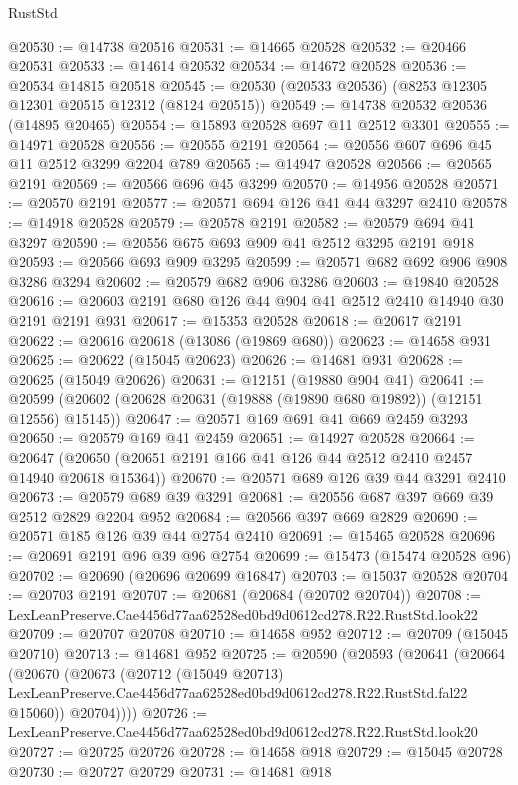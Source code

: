\begin{lexlean}{RustStd}
\begin{coremodule}
@20530 := @14738 @20516
@20531 := @14665 @20528
@20532 := @20466 @20531
@20533 := @14614 @20532
@20534 := @14672 @20528
@20536 := @20534 @14815 @20518
@20545 := @20530 (@20533 @20536) (@8253 @12305 @12301 @20515 @12312 (@8124 @20515))
@20549 := @14738 @20532 @20536 (@14895 @20465)
@20554 := @15893 @20528 @697 @11 @2512 @3301
@20555 := @14971 @20528
@20556 := @20555 @2191
@20564 := @20556 @607 @696 @45 @11 @2512 @3299 @2204 @789
@20565 := @14947 @20528
@20566 := @20565 @2191
@20569 := @20566 @696 @45 @3299
@20570 := @14956 @20528
@20571 := @20570 @2191
@20577 := @20571 @694 @126 @41 @44 @3297 @2410
@20578 := @14918 @20528
@20579 := @20578 @2191
@20582 := @20579 @694 @41 @3297
@20590 := @20556 @675 @693 @909 @41 @2512 @3295 @2191 @918
@20593 := @20566 @693 @909 @3295
@20599 := @20571 @682 @692 @906 @908 @3286 @3294
@20602 := @20579 @682 @906 @3286
@20603 := @19840 @20528
@20616 := @20603 @2191 @680 @126 @44 @904 @41 @2512 @2410 @14940 @30 @2191 @2191 @931
@20617 := @15353 @20528
@20618 := @20617 @2191
@20622 := @20616 @20618 (@13086 (@19869 @680))
@20623 := @14658 @931
@20625 := @20622 (@15045 @20623)
@20626 := @14681 @931
@20628 := @20625 (@15049 @20626)
@20631 := @12151 (@19880 @904 @41)
@20641 := @20599 (@20602 (@20628 @20631 (@19888 (@19890 @680 @19892)) (@12151 @12556) @15145))
@20647 := @20571 @169 @691 @41 @669 @2459 @3293
@20650 := @20579 @169 @41 @2459
@20651 := @14927 @20528
@20664 := @20647 (@20650 (@20651 @2191 @166 @41 @126 @44 @2512 @2410 @2457 @14940 @20618 @15364))
@20670 := @20571 @689 @126 @39 @44 @3291 @2410
@20673 := @20579 @689 @39 @3291
@20681 := @20556 @687 @397 @669 @39 @2512 @2829 @2204 @952
@20684 := @20566 @397 @669 @2829
@20690 := @20571 @185 @126 @39 @44 @2754 @2410
@20691 := @15465 @20528
@20696 := @20691 @2191 @96 @39 @96 @2754
@20699 := @15473 (@15474 @20528 @96)
@20702 := @20690 (@20696 @20699 @16847)
@20703 := @15037 @20528
@20704 := @20703 @2191
@20707 := @20681 (@20684 (@20702 @20704))
@20708 := LexLeanPreserve.Cae4456d77aa62528ed0bd9d0612cd278.R22.RustStd.look22
@20709 := @20707 @20708
@20710 := @14658 @952
@20712 := @20709 (@15045 @20710)
@20713 := @14681 @952
@20725 := @20590
    (@20593
      (@20641
        (@20664
          (@20670
            (@20673
              (@20712
                (@15049 @20713)
                LexLeanPreserve.Cae4456d77aa62528ed0bd9d0612cd278.R22.RustStd.fal22
                @15060))
            @20704))))
@20726 := LexLeanPreserve.Cae4456d77aa62528ed0bd9d0612cd278.R22.RustStd.look20
@20727 := @20725 @20726
@20728 := @14658 @918
@20729 := @15045 @20728
@20730 := @20727 @20729
@20731 := @14681 @918

\end{coremodule}
\end{lexlean}
